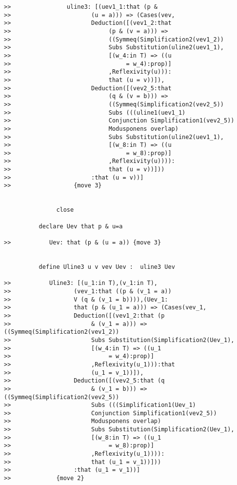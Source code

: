 \documentclass[12pt]{article}
\begin{document}
\begin{verbatim}
>>                uline3: [(uev1_1:that (p & 
>>                       (u = a))) => (Cases(vev,
>>                       Deduction([(vev1_2:that 
>>                            (p & (v = a))) => 
>>                            ((Symmeq(Simplification2(vev1_2)) 
>>                            Subs Substitution(uline2(uev1_1),
>>                            [(w_4:in T) => ((u 
>>                                 = w_4):prop)]
>>                            ,Reflexivity(u))):
>>                            that (u = v))]),
>>                       Deduction([(vev2_5:that 
>>                            (q & (v = b))) => 
>>                            ((Symmeq(Simplification2(vev2_5)) 
>>                            Subs (((uline1(uev1_1) 
>>                            Conjunction Simplification1(vev2_5)) 
>>                            Modusponens overlap) 
>>                            Subs Substitution(uline2(uev1_1),
>>                            [(w_8:in T) => ((u 
>>                                 = w_8):prop)]
>>                            ,Reflexivity(u)))):
>>                            that (u = v))]))
>>                       :that (u = v))]
>>                  {move 3}


               close

          declare Uev that p & u=a

>>           Uev: that (p & (u = a)) {move 3}


          define Uline3 u v vev Uev :  uline3 Uev

>>           Uline3: [(u_1:in T),(v_1:in T),
>>                  (vev_1:that ((p & (v_1 = a)) 
>>                  V (q & (v_1 = b)))),(Uev_1:
>>                  that (p & (u_1 = a))) => (Cases(vev_1,
>>                  Deduction([(vev1_2:that (p 
>>                       & (v_1 = a))) => ((Symmeq(Simplification2(vev1_2)) 
>>                       Subs Substitution(Simplification2(Uev_1),
>>                       [(w_4:in T) => ((u_1 
>>                            = w_4):prop)]
>>                       ,Reflexivity(u_1))):that 
>>                       (u_1 = v_1))]),
>>                  Deduction([(vev2_5:that (q 
>>                       & (v_1 = b))) => ((Symmeq(Simplification2(vev2_5)) 
>>                       Subs (((Simplification1(Uev_1) 
>>                       Conjunction Simplification1(vev2_5)) 
>>                       Modusponens overlap) 
>>                       Subs Substitution(Simplification2(Uev_1),
>>                       [(w_8:in T) => ((u_1 
>>                            = w_8):prop)]
>>                       ,Reflexivity(u_1)))):
>>                       that (u_1 = v_1))]))
>>                  :that (u_1 = v_1))]
>>             {move 2}



\end{verbatim}
\end{document}
